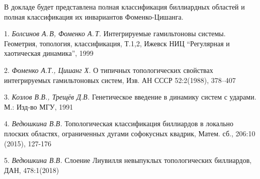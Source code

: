  В докладе будет представлена полная классификация биллиардных областей и полная классификация их инвариантов Фоменко-Цишанга.



\litlist

1. {\it Болсинов А.\,В, Фоменко А.\,Т.} Интегрируемые гамильтоновы системы.
Геометрия, топология, классификация,
\linebreak
Т.1,2,
   Ижевск
   НИЦ ``Регулярная и хаотическая динамика'',
  1999

2. {\it  Фоменко А.Т., Цишанг Х.} О типичных топологических свойствах
интегрируемых гамильтоновых систем,  Изв. АН СССР
   52:2(1988),
  378--407


  3. {\it Козлов В.В., Трещёв Д.В.} Генетическое  введение в динамику систем с ударами. М.: Изд-во МГУ, 1991

4.  {\it Ведюшкина В.В.} Топологическая классификация биллиардов в локально плоских областях,
ограниченных дугами софокусных квадрик, Матем. сб., 206:10 (2015), 127-176

  5. {\it Ведюшкина В.В.} Слоение Лиувилля невыпуклых топологических биллиардов, ДАН, 478:1(2018)


